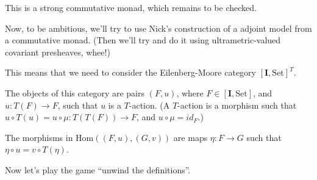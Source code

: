 \documentclass{article}
\newcommand{\Set}{\mathrm{Set}}
\newcommand{\I}{\mathbf{I}}
\newcommand{\Hom}{\mathrm{Hom}}
\begin{document}
This is a strong commutative monad, which remains to be checked. 

Now, to be ambitious, we'll try to use Nick's construction of a adjoint
model from a commutative monad. (Then we'll try and do it using ultrametric-valued
covariant presheaves, whee!)

This means that we need to consider the Eilenberg-Moore category $[\I,\Set]^T$. 

The objects of this category are pairs $(F, u)$, where $F \in [\I,\Set]$, and 
$u : T(F) \to F$, such that $u$ is a $T$-action. (A $T$-action is a morphism 
such that $u \circ T(u) = u \circ \mu : T(T(F)) \to F$, and $u \circ \mu = id_F$.)

The morphisms in $\Hom((F,u), (G,v))$ are maps $\eta : F \to G$ such
that $\eta \circ u = v \circ T(\eta)$.

Now let's play the game ``unwind the definitions''. 
\end{document}
